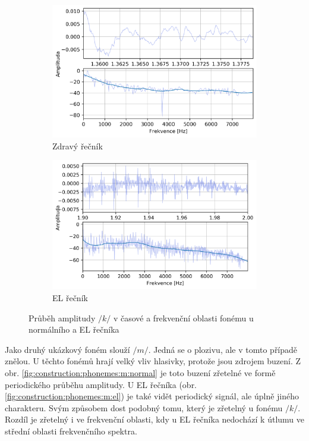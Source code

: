 \begin{figure}[htpb]
  \centering
  \begin{subfigure}[b]{0.45\textwidth}
    \includegraphics[width=\textwidth]{./ch5-construction/img/signal-normal_k.png}
    \caption{Zdravý řečník}
    \label{fig:construction:phonemes:k:normal}
  \end{subfigure}
  \begin{subfigure}[b]{0.45\textwidth}
    \includegraphics[width=\textwidth]{./ch5-construction/img/signal-el_k.png}
    \caption{EL řečník}
    \label{fig:construction:phonemes:k:el}
  \end{subfigure}
  \caption{Průběh amplitudy $/k/$ v časové a frekvenční oblasti fonému u normálního a EL řečníka}
  \label{fig:construction:phonemes:k}
\end{figure}

Jako druhý ukázkový foném slouží $/m/$. Jedná se o plozivu, ale v tomto případě znělou. U těchto fonémů hrají velký vliv hlasivky, protože jsou zdrojem buzení. Z obr. \ref{fig:construction:phonemes:m:normal} je toto buzení zřetelné ve formě periodického průběhu amplitudy. U EL řečníka (obr. \ref{fig:construction:phonemes:m:el}) je také vidět periodický signál, ale úplně jiného charakteru. Svým způsobem dost podobný tomu, který je zřetelný u fonému $/k/$. Rozdíl je zřetelný i ve frekvenční oblasti, kdy u EL řečníka nedochází k útlumu ve střední oblasti frekvenčního spektra.

